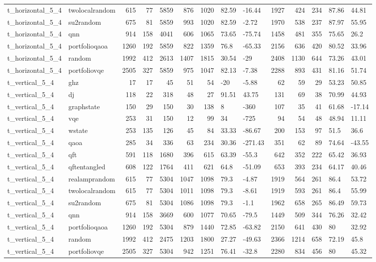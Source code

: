 \begin{longtable}{llrrrrrllrrrll}
t\_horizontal\_5\_4 & twolocalrandom & 615 & 77 & 5859 & 876 & 1020 & 82.59 & -16.44 & 1927 & 424 & 234 & 87.86 & 44.81 \\
t\_horizontal\_5\_4 & su2random & 675 & 81 & 5859 & 993 & 1020 & 82.59 & -2.72 & 1970 & 538 & 237 & 87.97 & 55.95 \\
t\_horizontal\_5\_4 & qnn & 914 & 158 & 4041 & 606 & 1065 & 73.65 & -75.74 & 1458 & 481 & 355 & 75.65 & 26.2 \\
t\_horizontal\_5\_4 & portfolioqaoa & 1260 & 192 & 5859 & 822 & 1359 & 76.8 & -65.33 & 2156 & 636 & 420 & 80.52 & 33.96 \\
t\_horizontal\_5\_4 & random & 1992 & 412 & 2613 & 1407 & 1815 & 30.54 & -29 & 2408 & 1130 & 644 & 73.26 & 43.01 \\
t\_horizontal\_5\_4 & portfoliovqe & 2505 & 327 & 5859 & 975 & 1047 & 82.13 & -7.38 & 2288 & 893 & 431 & 81.16 & 51.74 \\
t\_vertical\_5\_4 & ghz & 17 & 17 & 45 & 51 & 54 & -20 & -5.88 & 62 & 59 & 29 & 53.23 & 50.85 \\
t\_vertical\_5\_4 & dj & 118 & 22 & 318 & 48 & 27 & 91.51 & 43.75 & 131 & 69 & 38 & 70.99 & 44.93 \\
t\_vertical\_5\_4 & graphstate & 150 & 29 & 150 & 30 & 138 & 8 & -360 & 107 & 35 & 41 & 61.68 & -17.14 \\
t\_vertical\_5\_4 & vqe & 253 & 31 & 150 & 12 & 99 & 34 & -725 & 94 & 54 & 48 & 48.94 & 11.11 \\
t\_vertical\_5\_4 & wstate & 253 & 135 & 126 & 45 & 84 & 33.33 & -86.67 & 200 & 153 & 97 & 51.5 & 36.6 \\
t\_vertical\_5\_4 & qaoa & 285 & 34 & 336 & 63 & 234 & 30.36 & -271.43 & 351 & 62 & 89 & 74.64 & -43.55 \\
t\_vertical\_5\_4 & qft & 591 & 118 & 1680 & 396 & 615 & 63.39 & -55.3 & 642 & 352 & 222 & 65.42 & 36.93 \\
t\_vertical\_5\_4 & qftentangled & 608 & 122 & 1764 & 411 & 621 & 64.8 & -51.09 & 653 & 393 & 234 & 64.17 & 40.46 \\
t\_vertical\_5\_4 & realamprandom & 615 & 77 & 5304 & 1047 & 1098 & 79.3 & -4.87 & 1919 & 564 & 261 & 86.4 & 53.72 \\
t\_vertical\_5\_4 & twolocalrandom & 615 & 77 & 5304 & 1011 & 1098 & 79.3 & -8.61 & 1919 & 593 & 261 & 86.4 & 55.99 \\
t\_vertical\_5\_4 & su2random & 675 & 81 & 5304 & 1086 & 1098 & 79.3 & -1.1 & 1962 & 658 & 265 & 86.49 & 59.73 \\
t\_vertical\_5\_4 & qnn & 914 & 158 & 3669 & 600 & 1077 & 70.65 & -79.5 & 1449 & 509 & 344 & 76.26 & 32.42 \\
t\_vertical\_5\_4 & portfolioqaoa & 1260 & 192 & 5304 & 879 & 1440 & 72.85 & -63.82 & 2150 & 641 & 430 & 80 & 32.92 \\
t\_vertical\_5\_4 & random & 1992 & 412 & 2475 & 1203 & 1800 & 27.27 & -49.63 & 2366 & 1214 & 658 & 72.19 & 45.8 \\
t\_vertical\_5\_4 & portfoliovqe & 2505 & 327 & 5304 & 942 & 1251 & 76.41 & -32.8 & 2280 & 834 & 456 & 80 & 45.32 \\
\end{longtable}
